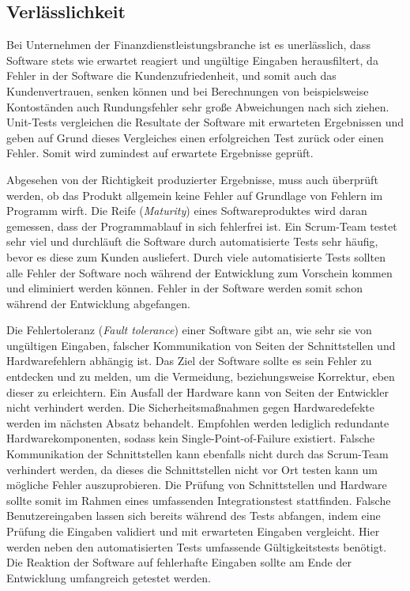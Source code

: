         \subsection{Verlässlichkeit}

            Bei Unternehmen der Finanzdienstleistungsbranche ist es unerlässlich, dass Software stets wie erwartet reagiert und ungültige Eingaben herausfiltert, da Fehler in der Software die Kundenzufriedenheit, und somit auch das Kundenvertrauen, senken können und bei Berechnungen von beispielsweise Kontoständen auch Rundungsfehler sehr große Abweichungen nach sich ziehen. Unit-Tests vergleichen die Resultate der Software mit erwarteten Ergebnissen und geben auf Grund dieses Vergleiches einen erfolgreichen Test zurück oder einen Fehler. Somit wird zumindest auf erwartete Ergebnisse geprüft.

             Abgesehen von der Richtigkeit produzierter Ergebnisse, muss auch überprüft werden, ob das Produkt allgemein keine Fehler auf Grundlage von Fehlern im Programm wirft. Die Reife (\emph{Maturity}) eines Softwareproduktes wird daran gemessen, dass der Programmablauf in sich fehlerfrei ist. Ein Scrum-Team testet sehr viel und durchläuft die Software durch automatisierte Tests sehr häufig, bevor es diese zum Kunden ausliefert. Durch viele automatisierte Tests sollten alle Fehler der Software noch während der Entwicklung zum Vorschein kommen und eliminiert werden können. Fehler in der Software werden somit schon während der Entwicklung abgefangen.

            Die Fehlertoleranz (\emph{Fault tolerance}) einer Software gibt an, wie sehr sie von ungültigen Eingaben, falscher Kommunikation von Seiten der Schnittstellen und Hardwarefehlern abhängig ist. Das Ziel der Software sollte es sein Fehler zu entdecken und zu melden, um die Vermeidung, beziehungsweise Korrektur, eben dieser zu erleichtern. Ein Ausfall der Hardware kann von Seiten der Entwickler nicht verhindert werden. Die Sicherheitsmaßnahmen gegen Hardwaredefekte werden im nächsten Absatz behandelt. Empfohlen werden lediglich redundante Hardwarekomponenten, sodass kein Single-Point-of-Failure existiert. Falsche Kommunikation der Schnittstellen kann ebenfalls nicht durch das Scrum-Team verhindert werden, da dieses die Schnittstellen nicht vor Ort testen kann um mögliche Fehler auszuprobieren. Die Prüfung von Schnittstellen und Hardware sollte somit im Rahmen eines umfassenden Integrationstest stattfinden.
            Falsche Benutzereingaben lassen sich bereits während des Tests abfangen, indem eine Prüfung die Eingaben validiert und mit erwarteten Eingaben vergleicht. Hier werden neben den automatisierten Tests umfassende Gültigkeitstests benötigt.
            Die Reaktion der Software auf fehlerhafte Eingaben sollte am Ende der Entwicklung umfangreich getestet werden.


